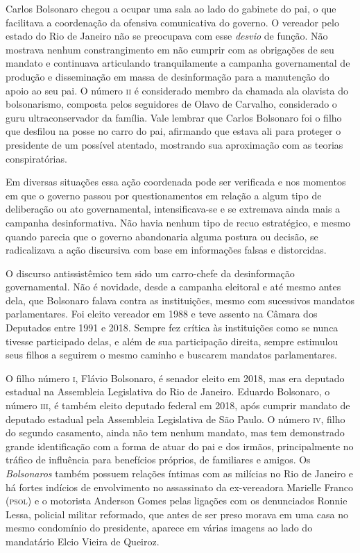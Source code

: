Carlos Bolsonaro chegou a ocupar uma sala ao lado do gabinete do pai, o
que facilitava a coordenação da ofensiva comunicativa do governo. O
vereador pelo estado do Rio de Janeiro não se preocupava com esse
\textit{desvio} de função. Não mostrava nenhum constrangimento em não cumprir
com as obrigações de seu mandato e continuava articulando tranquilamente
a campanha governamental de produção e disseminação em massa de
desinformação para a manutenção do apoio ao seu pai. O número \textsc{ii} é
considerado membro da chamada ala olavista do bolsonarismo, composta
pelos seguidores de Olavo de Carvalho, considerado o guru
ultraconservador da família. Vale lembrar que Carlos Bolsonaro foi o
filho que desfilou na posse no carro do pai, afirmando que estava ali
para proteger o presidente de um possível atentado, mostrando sua
aproximação com as teorias conspiratórias.

Em diversas situações essa ação coordenada pode ser verificada e nos
momentos em que o governo passou por questionamentos em relação a algum
tipo de deliberação ou ato governamental, intensificava-se e se
extremava ainda mais a campanha desinformativa. Não havia nenhum tipo de
recuo estratégico, e mesmo quando parecia que o governo abandonaria alguma
postura ou decisão, se radicalizava a ação discursiva com base em
informações falsas e distorcidas.

O discurso antissistêmico tem sido um carro-chefe da desinformação
governamental. Não é novidade, desde a campanha eleitoral e até mesmo
antes dela, que Bolsonaro falava contra as instituições, mesmo com
sucessivos mandatos parlamentares. Foi eleito vereador em 1988 e teve
assento na Câmara dos Deputados entre 1991 e 2018. Sempre fez crítica às
instituições como se nunca tivesse participado delas, e além de sua
participação direita, sempre estimulou seus filhos a seguirem o mesmo
caminho e buscarem mandatos parlamentares.

O filho número \textsc{i}, Flávio Bolsonaro, é senador eleito em 2018, mas era
deputado estadual na Assembleia Legislativa do Rio de Janeiro.
Eduardo Bolsonaro, o número \textsc{iii}, é também eleito deputado federal em 2018,
após cumprir mandato de deputado estadual pela Assembleia Legislativa de São Paulo. 
O número \textsc{iv}, filho do segundo casamento, ainda não
tem nenhum mandato, mas tem demonstrado grande identificação com a forma
de atuar do pai e dos irmãos, principalmente no tráfico de influência
para benefícios próprios, de familiares e amigos. Os \textit{Bolsonaros} também
possuem relações íntimas com as milícias no Rio de Janeiro e há fortes
indícios de envolvimento no assassinato da ex-vereadora Marielle Franco
(\textsc{psol}) e o motorista Anderson Gomes pelas ligações com os denunciados
Ronnie Lessa, policial militar reformado, que antes de ser preso morava em
uma casa no mesmo condomínio do presidente, aparece em várias imagens ao
lado do mandatário Elcio Vieira de Queiroz.

